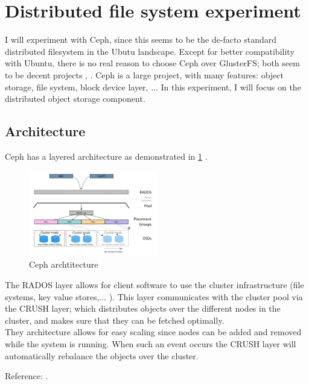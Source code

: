 \documentclass[12pt]{report}
\begin{document}
\section{Distributed file system experiment}
I will experiment with Ceph, since this seems to be the de-facto
standard distributed filesystem in the Ubutu landscape.
Except for better compatibility with Ubuntu, there is no real reason
to choose Ceph over GlusterFS; both seem to be decent projects
\cite{ceph_vs_gluster_1}, \cite{ceph_vs_gluster_debate}.
Ceph is a large project, with many features: object storage, file
system, block device layer, ... In this experiment, I will focus on
the distributed object storage component.

\subsection{Architecture}
\label{subsec:ceph_architecture}
Ceph has a layered architecture as demonstrated in
\ref{fig:ceph_architecture} \cite{ceph_architecture}.

\begin{figure}[h!]
  \caption{Ceph archtitecture}
  \label{fig:ceph_architecture}
  \centering
    \includegraphics[width=0.5\textwidth]{pics/ceph_architecture.png}
\end{figure}

The RADOS layer allows for client software to use the cluster
infrastructure  (file systems, key value stores,... ). This layer
communicates with the cluster pool via the CRUSH layer; which
distributes objects over the different nodes in the cluster, and makes
sure that they can be fetched optimally. \\
They architecture allows for easy scaling since nodes can be added and
removed while the system is running. When such an event occurs the
CRUSH layer will automatically rebalance the objects over the cluster.

Reference: \cite{ceph_developerworks}.
\end{document}
